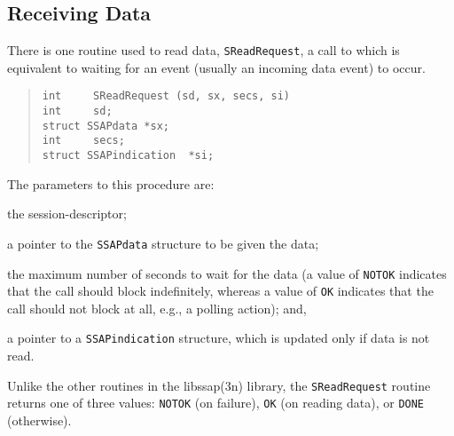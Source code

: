 \subsection	{Receiving Data}
There is one routine used to read data,
\verb"SReadRequest",
a call to which is equivalent to waiting for an event
(usually an incoming data event) to occur.
\begin{quote}\small\begin{verbatim}
int     SReadRequest (sd, sx, secs, si)
int     sd;
struct SSAPdata *sx;
int     secs;
struct SSAPindication  *si;
\end{verbatim}\end{quote}
The parameters to this procedure are:
\begin{describe}
\item[\verb"sd":] the session-descriptor;

\item[\verb"sx":] a pointer to the \verb"SSAPdata" structure to be given
the data;

\item[\verb"secs":] the maximum number of seconds to wait for the data
(a value of \verb"NOTOK" indicates that the call should block indefinitely,
whereas a value of \verb"OK" indicates that the call should not block at all,
e.g., a polling action);
and,

\item[\verb"si":] a pointer to a \verb"SSAPindication" structure, which is updated
only if data is not read.
\end{describe}
Unlike the other routines in the \man libssap(3n) library,
the \verb"SReadRequest" routine returns one of three values:
\verb"NOTOK" (on failure),
\verb"OK" (on reading data),
or
\verb"DONE" (otherwise).

